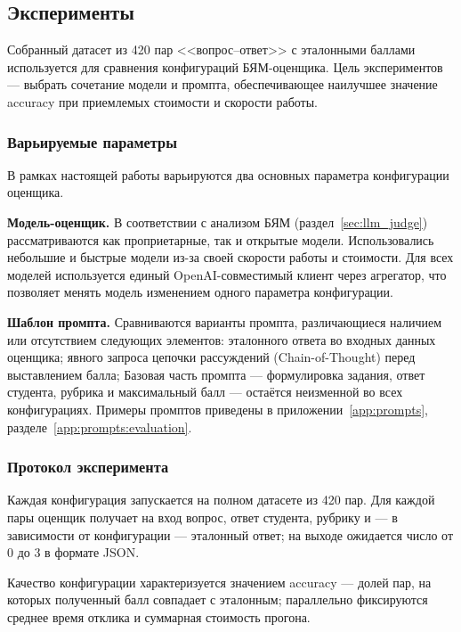 \subsection{Эксперименты}\label{sec:eval_experiments}

Собранный датасет из 420 пар <<вопрос--ответ>> с эталонными баллами
используется для сравнения конфигураций БЯМ-оценщика.
Цель экспериментов --- выбрать сочетание модели и промпта, обеспечивающее
наилучшее значение accuracy при приемлемых стоимости и скорости работы.

\subsubsection{Варьируемые параметры}

В рамках настоящей работы варьируются два основных параметра конфигурации
оценщика.

\textbf{Модель-оценщик.} В соответствии с анализом БЯМ
(раздел~\ref{sec:llm_judge}) рассматриваются как проприетарные, так и
открытые модели. Использовались небольшие и быстрые модели из-за своей скорости работы и стоимости. Для всех моделей используется единый
OpenAI-совместимый клиент через агрегатор, что позволяет менять модель
изменением одного параметра конфигурации.

\textbf{Шаблон промпта.} Сравниваются варианты промпта, различающиеся
наличием или отсутствием следующих элементов:
эталонного ответа во входных данных оценщика;
явного запроса цепочки рассуждений (Chain-of-Thought) перед выставлением
балла; Базовая часть промпта --- формулировка задания, ответ студента,
рубрика и максимальный балл --- остаётся неизменной во всех
конфигурациях. Примеры промптов приведены в приложении~\ref{app:prompts}, разделе~\ref{app:prompts:evaluation}.

\subsubsection{Протокол эксперимента}

Каждая конфигурация запускается на полном датасете из 420 пар. Для каждой
пары оценщик получает на вход вопрос, ответ студента, рубрику и --- в
зависимости от конфигурации --- эталонный ответ; на выходе ожидается
число от 0 до 3 в формате JSON. 

Качество конфигурации
характеризуется значением accuracy --- долей пар, на которых полученный
балл совпадает с эталонным; параллельно фиксируются среднее время отклика
и суммарная стоимость прогона.

